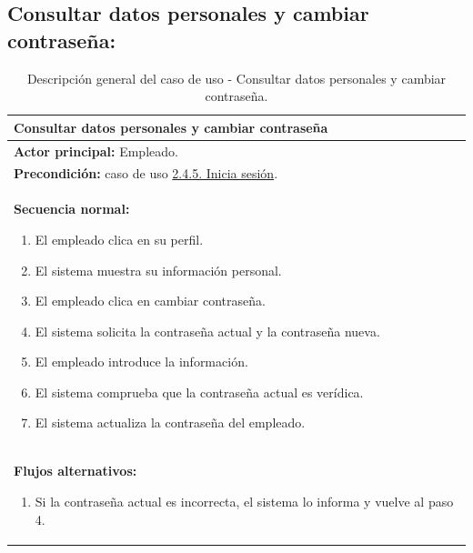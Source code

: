 \documentclass[12pt, a4paper, twoside]{report}
\begin{document}
        \subsection{Consultar datos personales y cambiar contraseña:}
            \begin{table}[H]
            \centering
            \begin{tabular}{|p{16cm}|} 
            \hline
            \textbf{Consultar datos personales y cambiar contraseña} \\ \hline
            \textbf{Actor principal:} Empleado. \\ \hline
            \textbf{Precondición:} caso de uso \hyperref[subsec:2.4.5.]{2.4.5. Inicia sesión}. \\ \hline
            \textbf{Secuencia normal:}
                \begin{enumerate}
                    \item El empleado clica en su perfil.
                    \item El sistema muestra su información personal.
                    \item El empleado clica en cambiar contraseña.
                    \item El sistema solicita la contraseña actual y la contraseña nueva.
                    \item El empleado introduce la información.
                    \item El sistema comprueba que la contraseña actual es verídica.
                    \item El sistema actualiza la contraseña del empleado.
                \end{enumerate} \\ \hline
            \textbf{Flujos alternativos:}
                \begin{enumerate}
                    \item[6.a.] Si la contraseña actual es incorrecta, el sistema lo informa y vuelve al paso 4.
                \end{enumerate} \\ \hline
            \end{tabular}
            \caption{Descripción general del caso de uso - Consultar datos personales y cambiar contraseña.}
            \end{table}
\end{document}

